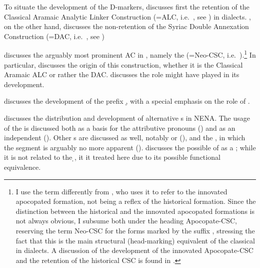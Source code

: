 \largerpage
To situate the development of the D-markers,  discusses first the retention of the Classical Aramaic Analytic Linker Construction (=ALC, i.e.\ \Syr {}, see ) in  dialects. , on the other hand, discusses the non-retention of the Syriac Double Annexation Construction (=DAC, i.e.\ \Syr {}, see )

 discusses the arguably most prominent AC in , namely the  (=Neo-CSC, i.e.\ \Bes {}).\footnote{I use the term  differently from \citet[3, fn. 15]{MutzafiBarzani}, who uses it to refer to the innovated apocopated \cst* formation,  not being a reflex of the historical \cst* formation. Since the distinction between the historical and the innovated apocopated  formations is not always obvious, I subsume both under the heading Apocopate-CSC, reserving the term Neo-CSC for the forms marked by the suffix \ed, stressing the fact that this is the main structural (head-marking)  equivalent of the classical  \cst* in  dialects. A discussion of the development of the innovated  Apocopate-CSC and the retention of the historical CSC is found in .} In particular,  discusses the origin of this construction, whether it is the Classical Aramaic ALC or rather the DAC.  discusses the role  might have played in its development.

 discusses the development of the \gen* prefix \d, with a special emphasis on the role of .

 discusses the distribution and development of alternative \lnk*s in  NE\-NA. The usage of the \lnk* {} is discussed both as a basis for the attributive pronouns () and as an independent \lnk* (). Other \lnk*s are discussed as well, notably  or  (), and the \JUrm {} \lnk*, in which the  segment is arguably no more apparent ().  discusses the possible  of  as a \lnk*; while it is not related to the \d \lnk*, it it treated here due to its possible functional equivalence.



